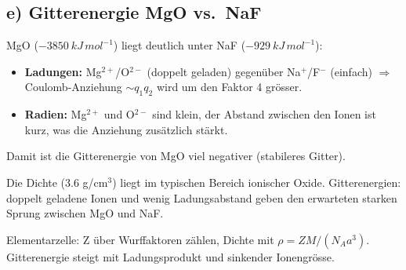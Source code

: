 \subsection*{e) Gitterenergie MgO vs.\ NaF}
MgO ($-3850\ kJ\,mol^{-1}$) liegt deutlich unter NaF ($-929\ kJ\,mol^{-1}$):
\begin{itemize}
  \item \textbf{Ladungen:} Mg$^{2+}$/O$^{2-}$ (doppelt geladen) gegenüber
        Na$^+$/F$^-$ (einfach) $\Rightarrow$ Coulomb-Anziehung $\sim
        q_1q_2$ wird um den Faktor 4 grösser.
  \item \textbf{Radien:} Mg$^{2+}$ und O$^{2-}$ sind klein, der Abstand
        zwischen den Ionen ist kurz, was die Anziehung zusätzlich stärkt.
\end{itemize}
Damit ist die Gitterenergie von MgO viel negativer (stabileres Gitter).

\begin{kontrolle}
Die Dichte (3.6 g/cm$^3$) liegt im typischen Bereich ionischer Oxide.
Gitterenergien: doppelt geladene Ionen und wenig Ladungsabstand geben den
erwarteten starken Sprung zwischen MgO und NaF.
\end{kontrolle}

\begin{merksatz}
Elementarzelle: Z über Wurffaktoren zählen, Dichte mit
$\rho=ZM/(N_A a^3)$. Gitterenergie steigt mit Ladungsprodukt und sinkender
Ionengrösse.
\end{merksatz}
